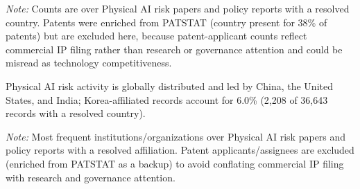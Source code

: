 \documentclass[11pt]{article}
\begin{document}
\begin{table}[htbp]
\centering
\footnotesize
\caption{Country distribution of Physical AI risk records}
\label{tab:country-top}

\par\smallskip\begin{minipage}{0.92\linewidth}
\footnotesize\textit{Note:} Counts are over Physical AI risk papers and policy reports with a resolved country. Patents were enriched from PATSTAT (country present for 38\% of patents) but are excluded here, because patent-applicant counts reflect commercial IP filing rather than research or governance attention and could be misread as technology competitiveness.
\end{minipage}
\end{table}

Physical AI risk activity is globally distributed and led by China, the United States, and India; Korea-affiliated records account for 6.0\% (2,208 of 36,643 records with a resolved country).

\begin{table}[htbp]
\centering
\footnotesize
\caption{Top institutions in Physical AI risk records}
\label{tab:institution-top}

\par\smallskip\begin{minipage}{0.92\linewidth}
\footnotesize\textit{Note:} Most frequent institutions/organizations over Physical AI risk papers and policy reports with a resolved affiliation. Patent applicants/assignees are excluded (enriched from PATSTAT as a backup) to avoid conflating commercial IP filing with research and governance attention.
\end{minipage}
\end{table}
\end{document}
